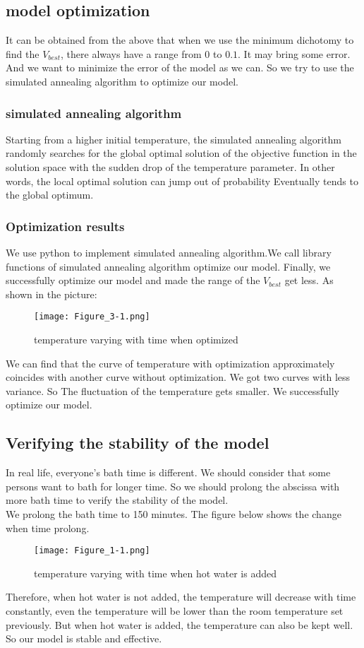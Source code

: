 \documentclass{mcmthesis}
\begin{document}
\subsection{model optimization}
\indent It can be obtained from the above that when we use the minimum dichotomy to find the $V_{best}$,  there always have a range from $0$ to $0.1$. It may bring some error. And we want to minimize the error of the model as we can. So we try to use the simulated annealing algorithm to optimize our model. 
\subsubsection{simulated annealing algorithm}
\indent Starting from a higher initial temperature, the simulated annealing algorithm randomly searches for the global optimal solution of the objective function in the solution space with the sudden drop of the temperature parameter. In other words, the local optimal solution can jump out of probability Eventually tends to the global optimum.
\subsubsection{Optimization results}
\indent We use python to implement simulated annealing algorithm.We call library functions of simulated annealing algorithm optimize our model. Finally, we successfully optimize our model and made the range of the $V_{best}$ get less. As shown in the picture:
\begin{figure}[H]	%
\centerline{\texttt{[image: Figure\_3-1.png]}}
\caption{temperature varying with time when optimized}
\label{oval}	
\end{figure}
\indent We can find that the curve of temperature with optimization approximately coincides with another curve without optimization. We got two curves with less variance. So The fluctuation of the temperature gets smaller. We successfully optimize our model.
\subsection{Verifying the stability of the model}%
\indent In real life, everyone's bath time is different. We should consider that some persons want to bath for longer time. So we should prolong the abscissa with more bath time to verify the stability of the model.\\
\indent We prolong the bath time to 150 minutes. The figure below shows the change when time prolong.
\begin{figure}[H]	%
\centerline{\texttt{[image: Figure\_1-1.png]}}
\caption{temperature varying with time when hot water is added}
\label{oval}	
\end{figure}
\indent Therefore, when hot water is not added, the temperature will decrease with time constantly, even the temperature will be lower than the room temperature set previously.
But when hot water is added, the temperature can also be kept well. So our model is stable and effective.
\end{document}
